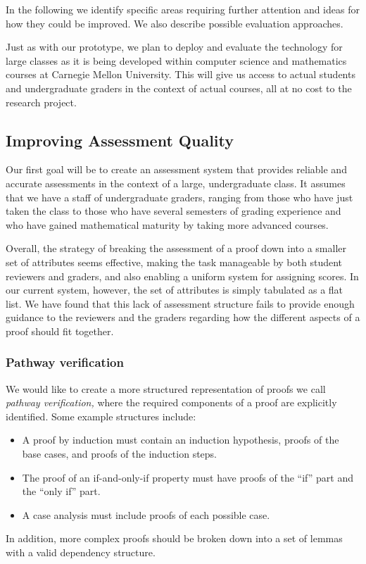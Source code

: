 \documentclass[12pt]{article}
\begin{document}
In the following we identify specific areas requiring further
attention and ideas for how they could be improved.  We also describe
possible evaluation approaches.

Just as with our prototype, we plan to deploy and evaluate
the technology for large classes
as it is being developed within computer science and
mathematics courses at Carnegie Mellon University.  This will give us
access to actual students and undergraduate graders in the context of
actual courses, all at no cost to the research project.

\subsection{Improving Assessment Quality}

Our first goal will be to create an assessment system that provides
reliable and accurate assessments in the context of a large,
undergraduate class.  It assumes that we have a staff of undergraduate
graders, ranging from those who have just taken the class to those who
have several semesters of grading experience and who have gained
mathematical maturity by taking more advanced courses.

Overall, the strategy of breaking the assessment of a proof down into a smaller
set of attributes seems effective, making the task manageable by
both student reviewers and graders, and also enabling a uniform
system for assigning scores.  In our current system, however, the set
of attributes is simply tabulated as a flat list.  We have found that
this lack of assessment structure fails to provide enough guidance to the
reviewers and the graders regarding how the different aspects of a
proof should fit together.

\subsubsection*{Pathway verification}

We would like to
create a more structured representation of proofs we call {\em pathway
  verification,}  where the required components of a proof are
explicitly identified.  Some example structures include:
\begin{itemize}
\item A proof by induction must contain an induction hypothesis,
  proofs of the base cases, and proofs of the induction steps.
\item The proof of an if-and-only-if property must have proofs of the
  ``if'' part and the ``only if'' part.
\item A case analysis must include proofs of each possible case.
\end{itemize}
In addition, more complex proofs should be broken down into a set of
lemmas with a valid dependency structure.
\end{document}
